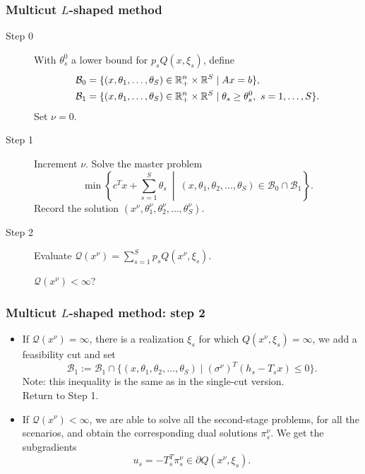 \documentclass[aspectratio=169]{beamer}
\begin{document}
\begin{frame}
\frametitle{Multicut $L$-shaped method}
	
\begin{description}
\item[Step 0]
With $\theta_s^0$ a lower bound for $p_s Q(x, \xi_s)$, define
\begin{align*}
\mathcal{B}_0 &= \lbrace (x, \theta_1, \ldots, \theta_S) \in {\mathbb{R}}^n_+ \times {\mathbb{R}}^S \mid Ax = b \rbrace, \\
\mathcal{B}_1 &= \lbrace (x, \theta_1, \ldots, \theta_S) \in {\mathbb{R}}^n_+ \times {\mathbb{R}}^S \mid \theta_s \geq \theta_s^0,\ s = 1,\ldots,S \rbrace.
\end{align*}
Set $\nu = 0$.
\item[Step 1]
Increment $\nu$.
Solve the master problem
\[
\min \left\lbrace c^Tx+\sum_{s = 1}^S \theta_s \ \middle|\
(x,\theta_1,\theta_2,\ldots,\theta_S) \in \mathcal{B}_0 \cap \mathcal{B}_1 \right\rbrace.
\]
Record the solution $( x^{\nu}, \theta_1^{\nu}, \theta_2^{\nu},\ldots,
\theta_S^{\nu} )$.
\item[Step 2]
Evaluate $\mathcal{Q}(x^{\nu}) = \sum_{s = 1}^S p_s Q(x^{\nu}, \xi_s)$.
		
		$\mathcal{Q}(x^{\nu}) < \infty$?
\end{description}
	
\end{frame}

\begin{frame}
\frametitle{Multicut $L$-shaped method: step 2}
	
\begin{itemize}
\item
If $\mathcal{Q}(x^{\nu}) = \infty$, there is a realization $\xi_s$ for which $Q(x^{\nu}, \xi_s) = \infty$, we add a feasibility cut and set
\[
\mathcal{B}_1 := \mathcal{B}_1 \cap \lbrace
(x,\theta_1,\theta_2,\ldots,\theta_S) \mid (\sigma^{\nu})^T(h_s -
T_sx) \leq 0\rbrace.
\]
Note: this inequality is the same as in the single-cut version.\\
Return to Step 1.
\item
If $\mathcal{Q}(x^{\nu}) < \infty$, we are able to solve all the second-stage problems, for all the scenarios, and obtain the corresponding dual solutions $\pi_s^{\nu}$.
We get the subgradients
\[
u_s = -T_s^T\pi_s^{\nu} \in \partial Q(x^{\nu}, \xi_s).
\]
\end{itemize}
	
\end{frame}
\end{document}
